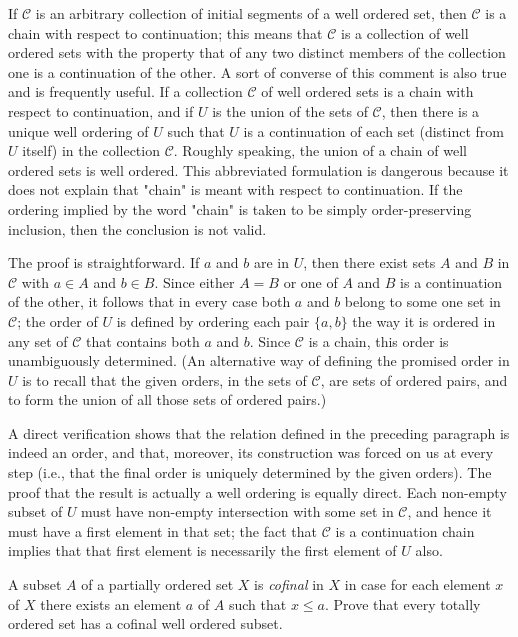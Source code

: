 If $\mathcal{C}$ is an arbitrary collection of initial segments of a well ordered set, then $\mathcal{C}$ is a chain with respect to continuation; this means that $\mathcal{C}$ is a collection of well ordered sets with the property that of any two distinct members of the collection one is a continuation of the other. A sort of converse of this comment is also true and is frequently useful. If a collection $\mathcal{C}$ of well ordered sets is a chain with respect to continuation, and if $U$ is the union of the sets of $\mathcal{C}$, then there is a unique well ordering of $U$ such that $U$ is a continuation of each set (distinct from $U$ itself) in the collection $\mathcal{C}$. Roughly speaking, the union of a chain of well ordered sets is well ordered. This abbreviated formulation is dangerous because it does not explain that "chain" is meant with respect to continuation. If the ordering implied by the word "chain" is taken to be simply order-preserving inclusion, then the conclusion is not valid. 

The proof is straightforward. If $a$ and $b$ are in $U$, then there exist sets $A$ and $B$ in $\mathcal{C}$ with $a \in A$ and $b \in B$. Since either $A = B$ or one of $A$ and $B$ is a continuation of the other, it follows that in every case both $a$ and $b$ belong to some one set in $\mathcal{C}$; the order of $U$ is defined by ordering each pair $\{ a,b \}$ the way it is ordered in any set of $\mathcal{C}$ that contains both $a$ and $b$. Since $\mathcal{C}$ is a chain, this order is unambiguously determined. (An alternative way of defining the promised order in $U$ is to recall that the given orders, in the sets of $\mathcal{C}$, are sets of ordered pairs, and to form the union of all those sets of ordered pairs.) 

A direct verification shows that the relation defined in the preceding paragraph is indeed an order, and that, moreover, its  construction was forced on us at every step (i.e., that the final order is uniquely determined by the given orders). The proof that the result is actually a well ordering is equally direct. Each non-empty subset of $U$ must have non-empty intersection with some set in $\mathcal{C}$, and hence it must have a first element in that set; the fact that $\mathcal{C}$ is a continuation chain implies that that first element is necessarily the first element of $U$ also. 

\begin{exercise} A subset $A$ of a partially ordered set $X$ is \textit{cofinal} in $X$ in case for each element $x$ of $X$ there exists an element $a$ of $A$ such that $x \le a$. Prove that every totally ordered set has a cofinal well ordered subset.
\end{exercise}

